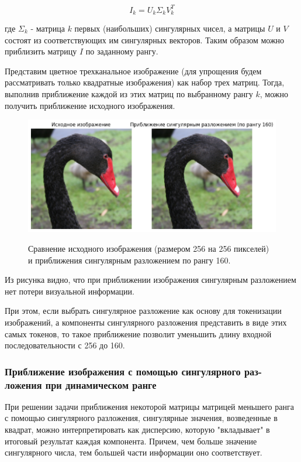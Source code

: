 \documentclass[times,specification,annotation]{itmo-student-thesis}
\begin{document}
$$
I_k = U_k\Sigma_kV_k^T
$$

где $\Sigma_k$ - матрица $k$ первых (наибольших) сингулярных чисел, а матрицы $U$ и $V$ состоят из соответствующих им сингулярных векторов. Таким образом можно приблизить матрицу $I$ по заданному рангу. 

Представим цветное трехканальное изображение (для упрощения будем рассматривать только квадратные изображения) как набор трех матриц. Тогда, выполнив приближение каждой из этих матриц по выбранному рангу $k$, можно получить приближение исходного изображения.

\begin{figure}[H]
    \centering
    \includegraphics[width=1.0\textwidth]
    {images/solutions_analysis/svd/svd_approx_im_160rank.png}
    \label{fig:svd_approx_im_fix_rank}
    \caption{Сравнение исходного изображения (размером 256 на 256 пикселей) и приближения сингулярным разложением по рангу 160.}
\end{figure}

Из рисунка видно, что при приближении изображения сингулярным разложением нет потери визуальной информации.

При этом, если выбрать сингулярное разложение как основу для токенизации изображений, а компоненты сингулярного разложения представить в виде этих самых токенов, то такое приближение позволит уменьшить длину входной последовательности с 256 до 160.

\subsubsection{Приближение изображения с помощью сингулярного раз-
ложения при динамическом ранге}

При решении задачи приближения некоторой матрицы матрицей меньшего ранга с помощью сингулярного разложения, сингулярные значения, возведенные в квадрат, можно интерпретировать как дисперсию, которую "вкладывает" в итоговый результат каждая компонента. Причем, чем больше значение сингулярного числа, тем большей части информации оно соответствует. 
\end{document}

